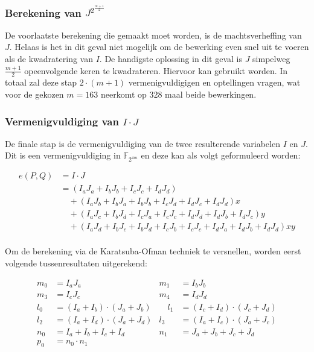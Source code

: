 \subsubsection{Berekening van $J^{2^{\frac{m + 1}{2}}}$}

De voorlaatste berekening die gemaakt moet worden, is de machtsverheffing van $J$. Helaas is het in dit geval niet mogelijk om de bewerking even snel uit te voeren als de kwadratering van $I$. De handigste oplossing in dit geval is $J$ simpelweg $\frac{m + 1}{2}$ opeenvolgende keren te kwadrateren. Hiervoor kan  gebruikt worden. In totaal zal deze stap $2 \cdot (m + 1)$ vermenigvuldigigen en optellingen vragen, wat voor de gekozen $m = 163$ neerkomt op 328 maal beide bewerkingen.

\subsubsection{Vermenigvuldiging van $I \cdot J$}

De finale stap is de vermenigvuldiging van de twee resulterende variabelen $I$ en $J$. Dit is een vermenigvuldiging in $\mathbb{F}_{2^{4m}}$ en deze kan als volgt geformuleerd worden:

\[\begin{aligned}
e(P, Q)	&= I \cdot J\\
	&= (I_a J_a + I_b J_b + I_c J_c + I_d J_d)\\
	&\quad + (I_a J_b + I_b J_a + I_b J_b + I_c J_d + I_d J_c + I_d J_d)x\\
	&\quad + (I_a J_c + I_b J_d + I_c J_a + I_c J_c + I_d J_d + I_d J_b + I_d J_c)y\\
	&\quad + (I_a J_d + I_b J_c + I_b J_d + I_c J_b + I_c J_c + I_d J_a + I_d J_b + I_d J_d)xy\\
\end{aligned}\]

Om de berekening via de Karatsuba-Ofman techniek te versnellen, worden eerst volgende tussenresultaten uitgerekend:

\[\begin{aligned}
m_0	&= I_a J_a
	&m_1	&= I_b J_b\\
m_3	&= I_c J_c
	&m_4	&= I_d J_d\\
l_0	&= (I_a + I_b) \cdot (J_a + J_b)
	&\quad l_1	&= (I_c + I_d) \cdot (J_c + J_d)\\
l_2	&= (I_a + I_d) \cdot (J_a + J_d)
	&l_3	&= (I_a + I_c) \cdot (J_a + J_c)\\
n_0	&= I_a + I_b + I_c + I_d
	&n_1	&= J_a + J_b + J_c + J_d\\
p_0	&= n_0 \cdot n_1\\
\end{aligned}\]

